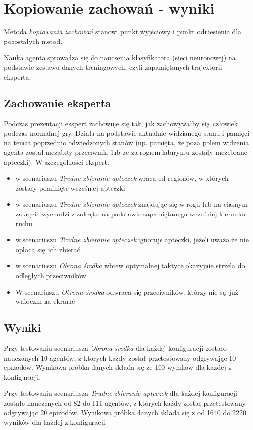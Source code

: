 \section{Kopiowanie zachowań - wyniki}\label{bc_results}
Metoda \textit{kopiowania zachowań} stanowi punkt wyjściowy i punkt odniesienia dla pozostałych metod.

Nauka agenta sprowadza się do nauczenia klasyfikatora (sieci neuronowej) na podstawie zestawu danych treningowych, czyli zapamiętanych trajektorii eksperta.


\subsection {Zachowanie eksperta}
Podczas prezentacji ekspert zachowuje się tak, jak zachowywałby się człowiek podczas normalnej gry. Działa na podstawie aktualnie widzianego stanu i pamięci na temat poprzednio odwiedzonych stanów (np. pamięta, że poza polem widzenia agenta został niezabity przeciwnik, lub że za rogiem labiryntu zostały niezebrane apteczki). W szczególności ekspert:
\begin{itemize}
\item{w scenariuszu \textit{Trudne zbieranie apteczek} wraca od regionów, w których zostały pominięte wcześniej apteczki}
\item{w scenariuszu \textit{Trudne zbieranie apteczek} znajdując się w rogu lub na ciasnym zakręcie wychodzi z zakrętu na podstawie zapamiętanego wcześniej kierunku ruchu}
\item{w scenariuszu \textit{Trudne zbieranie apteczek} ignoruje apteczki, jeżeli uważa że nie opłaca się ich zbierać}
\item{w scenariuszu \textit{Obrona środka} wbrew optymalnej taktyce okazyjnie strzela do odległych przeciwników}
\item{W scenariuszu \textit{Obrona środka} odwraca się przeciwników, którzy nie są już widoczni na ekranie}
\end{itemize}


\subsection{Wyniki}

Przy testowaniu scenariusza \textit{Obrona środka} dla każdej konfiguracji zostało nauczonych 10 agentów, z których każdy został przetestowany odgrywając 10 epizodów. Wynikowa próbka danych składa się ze 100 wyników dla każdej z konfiguracji.

Przy testowaniu scenariusza \textit{Trudne zbieranie apteczek} dla każdej konfiguracji zostało nauczonych od 82 do 111 agentów, z których każdy został przetestowany odgrywając 20 epizodów. Wynikowa próbka danych składa się z od 1640 do 2220 wyników dla każdej z konfiguracji.

